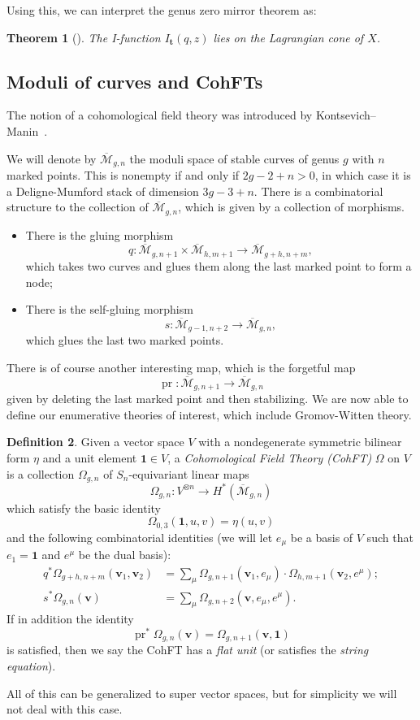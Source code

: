 \documentclass{amsart}
\newtheorem{thm}{Theorem}[section]
\theoremstyle{definition}
\newtheorem{defn}[thm]{Definition}
\theoremstyle{remark}
\theoremstyle{plain}
\theoremstyle{definition}
\theoremstyle{remark}
\newcommand{\Mbar}{\overline{\mathcal{M}}}
\newcommand{\mbf}[1]{\mathbf{#1}}
\newcommand{\bv}{\mbf{v}}
\newcommand{\1}{\mathbf{1}}
\newcommand{\2}{\mathbf{2}}
\newcommand{\3}{\mathbf{3}}
\DeclareMathOperator{\pr}{pr}
\begin{document}
Using this, we can interpret the genus zero mirror theorem as:
\begin{thm}[{\cite{Givental1998}}]
    The I-function \(I_{\mbf{t}}(q,z)\) lies on the Lagrangian cone of \(X\).
\end{thm}




\subsection{Moduli of curves and CohFTs}%
\label{sub:Moduli of curves and CohFTs}

The notion of a cohomological field theory was introduced by Kontsevich--Manin~\cite{KM1994}.

We will denote by $\Mbar_{g,n}$ the moduli space of stable curves of genus $g$ with $n$ marked points. This is nonempty if and only if $2g-2+n > 0$, in which case it is a Deligne-Mumford stack of dimension $3g-3+n$. There is a combinatorial structure to the collection of $\Mbar_{g,n}$, which is given by a collection of morphisms.
\begin{itemize}
    \item There is the gluing morphism 
        \[q \colon \Mbar_{g,n+1} \times \Mbar_{h, m+1} \to \Mbar_{g+h,n+m}, \] 
        which takes two curves and glues them along the last marked point to form a node;
    \item There is the self-gluing morphism \[s \colon \Mbar_{g-1,n+2} \to \Mbar_{g,n},\] 
        which glues the last two marked points.
\end{itemize}
There is of course another interesting map, which is the forgetful map
\[ \pr \colon \Mbar_{g,n+1} \to \Mbar_{g,n} \]
given by deleting the last marked point and then stabilizing. We are now able to define our enumerative theories of interest, which include Gromov-Witten theory.

\begin{defn}
    Given a vector space $V$ with a nondegenerate symmetric bilinear form $\eta$ and a unit element $\1 \in V$, a \textit{Cohomological Field Theory (CohFT)} $\Omega$ on $V$ is a collection $\Omega_{g,n}$ of $S_n$-equivariant linear maps
    \[ \Omega_{g,n} \colon V^{\otimes n} \to H^*(\Mbar_{g,n}) \]
    which satisfy the basic identity
    \[ \Omega_{0,3}(\1, u,v) = \eta(u,v) \]
    and the following combinatorial identities (we will let $e_{\mu}$ be a basis of $V$ such that $e_1 = \1$ and $e^{\mu}$ be the dual basis):
    \begin{align*}
        q^* \Omega_{g+h,n+m}(\bv_1, \bv_2) &= \sum_{\mu} \Omega_{g,n+1}(\bv_1, e_{\mu}) \cdot \Omega_{h,m+1}(  \bv_2, e^{\mu} ); \\
        s^* \Omega_{g,n}(\bv) &= \sum_{\mu} \Omega_{g,n+2}(\bv, e_{\mu}, e^{\mu}).
    \end{align*}
    If in addition the identity
    \[ \pr^*\Omega_{g,n}(\bv) = \Omega_{g,n+1}(\bv,\1) \]
    is satisfied, then we say the CohFT has a \textit{flat unit} (or satisfies the \textit{string equation}).
\end{defn}
All of this can be generalized to super vector spaces, but for simplicity we will not deal with this case.
\end{document}
